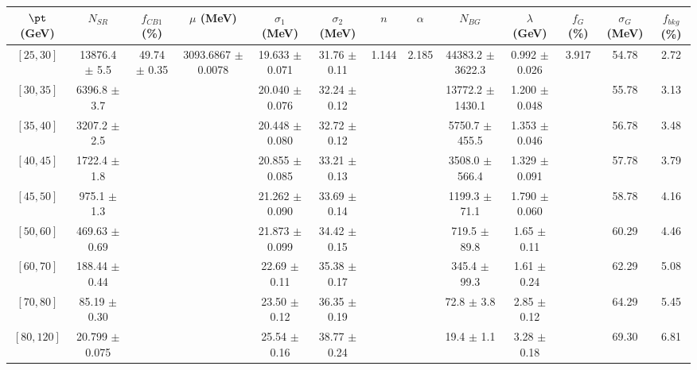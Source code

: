 \begin{tabular}{c||c|c|c|c|c|c|c|c|c|c|c||c}
$\pt$ (GeV) & $N_{SR}$ & $f_{CB1}$ (\%) & $\mu$ (MeV) & $\sigma_1$ (MeV) & $\sigma_2$ (MeV) & $n$ & $\alpha$ & $N_{BG}$ & $\lambda$ (GeV) & $f_G$ (\%) & $\sigma_G$ (MeV) & $f_{bkg}$ (\%) \\
\hline
$[25, 30]$ & 13876.4 $\pm$ 5.5 & \multirow{9}{*}{49.74 $\pm$ 0.35} & \multirow{9}{*}{3093.6867 $\pm$ 0.0078} & 19.633 $\pm$ 0.071 & 31.76 $\pm$ 0.11 & \multirow{9}{*}{1.144} & \multirow{9}{*}{2.185} & 44383.2 $\pm$ 3622.3 & 0.992 $\pm$ 0.026 & \multirow{9}{*}{3.917} & 54.78 & 2.72\\
$[30, 35]$ & 6396.8 $\pm$ 3.7 &  &  & 20.040 $\pm$ 0.076 & 32.24 $\pm$ 0.12 &  &  & 13772.2 $\pm$ 1430.1 & 1.200 $\pm$ 0.048 &  & 55.78 & 3.13\\
$[35, 40]$ & 3207.2 $\pm$ 2.5 &  &  & 20.448 $\pm$ 0.080 & 32.72 $\pm$ 0.12 &  &  & 5750.7 $\pm$ 455.5 & 1.353 $\pm$ 0.046 &  & 56.78 & 3.48\\
$[40, 45]$ & 1722.4 $\pm$ 1.8 &  &  & 20.855 $\pm$ 0.085 & 33.21 $\pm$ 0.13 &  &  & 3508.0 $\pm$ 566.4 & 1.329 $\pm$ 0.091 &  & 57.78 & 3.79\\
$[45, 50]$ & 975.1 $\pm$ 1.3 &  &  & 21.262 $\pm$ 0.090 & 33.69 $\pm$ 0.14 &  &  & 1199.3 $\pm$ 71.1 & 1.790 $\pm$ 0.060 &  & 58.78 & 4.16\\
$[50, 60]$ & 469.63 $\pm$ 0.69 &  &  & 21.873 $\pm$ 0.099 & 34.42 $\pm$ 0.15 &  &  & 719.5 $\pm$ 89.8 & 1.65 $\pm$ 0.11 &  & 60.29 & 4.46\\
$[60, 70]$ & 188.44 $\pm$ 0.44 &  &  & 22.69 $\pm$ 0.11 & 35.38 $\pm$ 0.17 &  &  & 345.4 $\pm$ 99.3 & 1.61 $\pm$ 0.24 &  & 62.29 & 5.08\\
$[70, 80]$ & 85.19 $\pm$ 0.30 &  &  & 23.50 $\pm$ 0.12 & 36.35 $\pm$ 0.19 &  &  & 72.8 $\pm$ 3.8 & 2.85 $\pm$ 0.12 &  & 64.29 & 5.45\\
$[80, 120]$ & 20.799 $\pm$ 0.075 &  &  & 25.54 $\pm$ 0.16 & 38.77 $\pm$ 0.24 &  &  & 19.4 $\pm$ 1.1 & 3.28 $\pm$ 0.18 &  & 69.30 & 6.81\\
\end{tabular}
